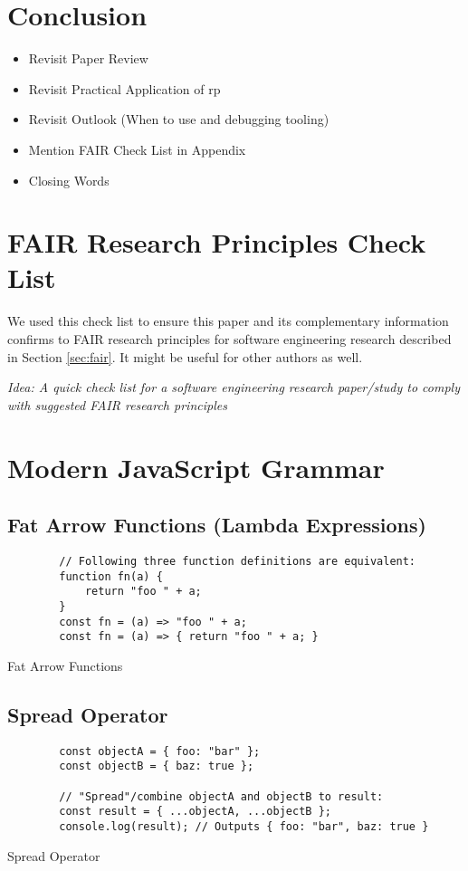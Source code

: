 \documentclass[12pt,a4paper]{article}
\begin{document}
\section{Conclusion}
\begin{itemize}
	\item Revisit Paper Review
	\item Revisit Practical Application of rp
	\item Revisit Outlook (When to use and debugging tooling)
	\item Mention FAIR Check List in Appendix
	\item Closing Words
\end{itemize}

\appendix

\section{FAIR Research Principles Check List}

We used this check list to ensure this paper and its complementary information confirms to FAIR research principles for software engineering research described in Section \ref{sec:fair}. It might be useful for other authors as well.

\begin{framed}
	\noindent\emph{Idea: A quick check list for a software engineering research paper/study to comply with suggested FAIR research principles}
\end{framed}

\section{Modern JavaScript Grammar}
\label{sec:modern-javascript-grammar}

\subsection{Fat Arrow Functions (Lambda Expressions)}
\begin{listing}[H]
	\begin{verbatim}
		// Following three function definitions are equivalent:
		function fn(a) {
			return "foo " + a;
		}
		const fn = (a) => "foo " + a;
		const fn = (a) => { return "foo " + a; }
	\end{verbatim}
	\caption{Fat Arrow Functions}
\end{listing}

\subsection{Spread Operator}
\begin{listing}[H]
	\begin{verbatim}
		const objectA = { foo: "bar" };
		const objectB = { baz: true };

		// "Spread"/combine objectA and objectB to result:
		const result = { ...objectA, ...objectB };
		console.log(result); // Outputs { foo: "bar", baz: true }
	\end{verbatim}
	\caption{Spread Operator}
\end{listing}
\end{document}
